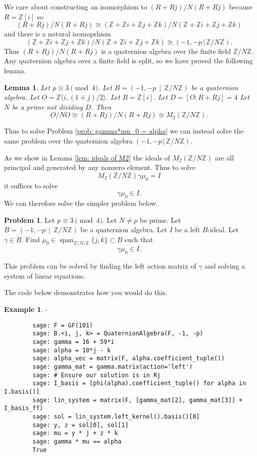 \documentclass[10pt]{article}
\theoremstyle{plain}
\newtheorem{lemma}[theorem]{Lemma}
\theoremstyle{definition}
\newtheorem{example}[theorem]{Example}
\newtheorem{prob}[theorem]{Problem}
\newcommand{\iso}{\cong}
\newcommand{\op}{\operatorname}
\newcommand{\Z}{\mathbb{Z}}
\begin{document}
We care about constructing an isomorphism to \( (R + Rj) / N(R + Rj) \) because \( R = \Z[i] \) so
\[
    (R + Rj) / N(R + Rj) \iso (\Z + \Z i + \Z j + \Z k) / N (\Z + \Z i + \Z j + \Z k)
\]
and there is a natural isomoprhism
\[
    (\Z + \Z i + \Z j + \Z k) / N (\Z + \Z i + \Z j + \Z k) \iso (-1, -p \, |\, \Z / N \Z).
\]
Thus \( (R + Rj) / N(R + Rj) \) is a quaternion algebra over the finite field \( \Z / N\Z \).
Any quaternion algebra over a finite field is split, so we have proved the following lemma.

\begin{lemma} \label{lem: O / NO isomorphism}
    Let \( p \equiv 3 \pmod{4} \).
    Let \( B =  (-1, -p \, \mid \, \Z / N \Z) \) be a quaternion algebra.
    Let \( O = \Z \langle i, (1+j) / 2 \rangle \).
    Let \( R = \Z[i] \).
    Let \( D =  [O : R + Rj] = 4\)
    Let \( N \) be a prime not dividing \( D \).
    Then
    \[
        O / NO \iso (R + Rj) / N(R + Rj) \iso M_2(\Z / N \Z  ).
    \]
\end{lemma}


Thus to solve Problem \ref{prob: gamma*mu_0 = alpha} we can instead solve the same problem over the quaternion algebra \( ( -1, -p \, |\, \Z / N \Z) \).

As we show in Lemma \ref{lem: ideals of M2} the ideals of \( M_2(\Z / N \Z  ) \) are all principal and generated by any nonzero element.
Thus to solve
\[
    M_2(\Z / N\Z)\gamma\mu_0 = I
\]
it suffices to solve
\[
    \gamma\mu_0 \in I.
\]
We can therefore solve the simpler problem below.
\begin{prob}
    Let \( p \equiv 3 \pmod{4} \).
    Let \( N \neq p\) be prime.
    Let \( B =  (-1, -p \, \mid \, \Z / N \Z) \) be a quaternion algebra.
    Let \( I \) be a left \( B \)-ideal.
    Let \( \gamma \in B \).
    Find \( \mu_0 \in \op{span}_{\Z / N / \Z}\{j, k\} \subset  B \) such that
    \[
        \gamma\mu_0 \in I.
    \]
\end{prob}

This problem can be solved by finding the left action matrix of \( \gamma \) and solving a system of linear equations.

The code below demonstrates how you would do this.

\begin{example}
    -
    \begin{lstlisting}
        sage: F = GF(101)
        sage: B.<i, j, k> = QuaternionAlgebra(F, -1, -p)
        sage: gamma = 16 + 59*i
        sage: alpha = 10*j - k
        sage: alpha_vec = matrix(F, alpha.coefficient_tuple())
        sage: gamma_mat = gamma.matrix(action='left')
        sage: # Ensure our solution is in Rj
        sage: I_basis = [phi(alpha).coefficient_tuple() for alpha in I.basis()]
        sage: lin_system = matrix(F, [gamma_mat[2], gamma_mat[3]] + I_basis_ff)
        sage: sol = lin_system.left_kernel().basis()[0]
        sage: y, z = sol[0], sol[1]
        sage: mu = y * j + z * k
        sage: gamma * mu == alpha
        True
    \end{lstlisting}
\end{example}
\end{document}
